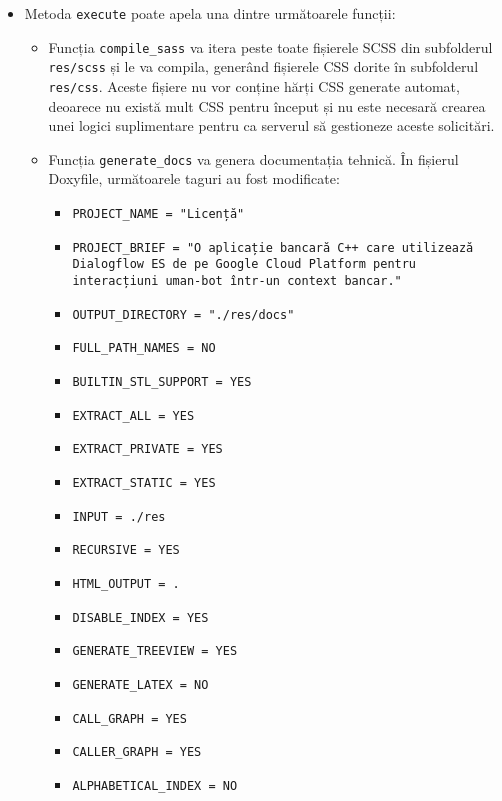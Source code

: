 \begin{itemize}
    \item Metoda \texttt{execute} poate apela una dintre următoarele funcții:
    \begin{itemize}
        \item Funcția \texttt{compile\_sass} va itera peste toate fișierele SCSS din subfolderul \texttt{res/scss} și le va compila, generând fișierele CSS dorite în subfolderul \texttt{res/css}. Aceste fișiere nu vor conține hărți CSS generate automat, deoarece nu există mult CSS pentru început și nu este necesară crearea unei logici suplimentare pentru ca serverul să gestioneze aceste solicitări.
        \item Funcția \texttt{generate\_docs} va genera documentația tehnică. În fișierul Doxyfile, următoarele taguri au fost modificate:
        \begin{itemize}
            \item \texttt{PROJECT\_NAME = "Licență"}
            \item \texttt{PROJECT\_BRIEF = "O aplicație bancară C++ care utilizează Dialogflow ES de pe Google Cloud Platform pentru interacțiuni uman-bot într-un context bancar."}
            \item \texttt{OUTPUT\_DIRECTORY = "./res/docs"}
            \item \texttt{FULL\_PATH\_NAMES = NO}
            \item \texttt{BUILTIN\_STL\_SUPPORT = YES}
            \item \texttt{EXTRACT\_ALL = YES}
            \item \texttt{EXTRACT\_PRIVATE = YES}
            \item \texttt{EXTRACT\_STATIC = YES}
            \item \texttt{INPUT = ./res}
            \item \texttt{RECURSIVE = YES}
            \item \texttt{HTML\_OUTPUT = .}
            \item \texttt{DISABLE\_INDEX = YES}
            \item \texttt{GENERATE\_TREEVIEW = YES}
            \item \texttt{GENERATE\_LATEX = NO}
            \item \texttt{CALL\_GRAPH = YES}
            \item \texttt{CALLER\_GRAPH = YES}
            \item \texttt{ALPHABETICAL\_INDEX = NO}
        \end{itemize}

\end{itemize}
\end{itemize}

